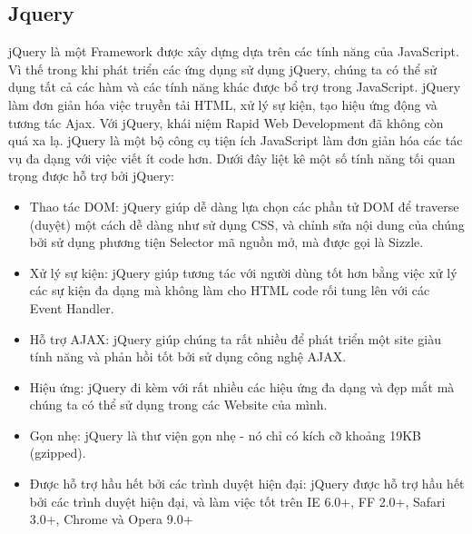 \subsection{Jquery}
jQuery là một Framework được xây dựng dựa trên các tính năng của JavaScript. Vì thế trong khi phát triển các ứng dụng sử dụng jQuery, chúng ta có thể sử dụng tất cả các hàm và các tính năng khác được bổ trợ trong JavaScript. jQuery làm đơn giản hóa việc truyền tải HTML, xử lý sự kiện, tạo hiệu ứng động và tương tác Ajax. Với jQuery, khái niệm Rapid Web Development đã không còn quá xa lạ. jQuery là một bộ công cụ tiện ích JavaScript làm đơn giản hóa các tác vụ đa dạng với việc viết ít code hơn. Dưới đây liệt kê một số tính năng tối quan trọng được hỗ trợ bởi jQuery:
\begin{itemize}
\item Thao tác DOM: jQuery giúp dễ dàng lựa chọn các phần tử DOM để traverse (duyệt) một cách dễ dàng như sử dụng CSS, và chỉnh sửa nội dung của chúng bởi sử dụng phương tiện Selector mã nguồn mở, mà được gọi là Sizzle.
\item Xử lý sự kiện: jQuery giúp tương tác với người dùng tốt hơn bằng việc xử lý các sự kiện đa dạng mà không làm cho HTML code rối tung lên với các Event Handler.
\item Hỗ trợ AJAX: jQuery giúp chúng ta rất nhiều để phát triển một site giàu tính năng và phản hồi tốt bởi sử dụng công nghệ AJAX.
\item Hiệu ứng: jQuery đi kèm với rất nhiều các hiệu ứng đa dạng và đẹp mắt mà chúng ta có thể sử dụng trong các Website của mình.
\item Gọn nhẹ: jQuery là thư viện gọn nhẹ - nó chỉ có kích cỡ khoảng 19KB (gzipped).
\item Được hỗ trợ hầu hết bởi các trình duyệt hiện đại: jQuery được hỗ trợ hầu hết bởi các trình duyệt hiện đại, và làm việc tốt trên IE 6.0+, FF 2.0+, Safari 3.0+, Chrome và Opera 9.0+
\end{itemize}


